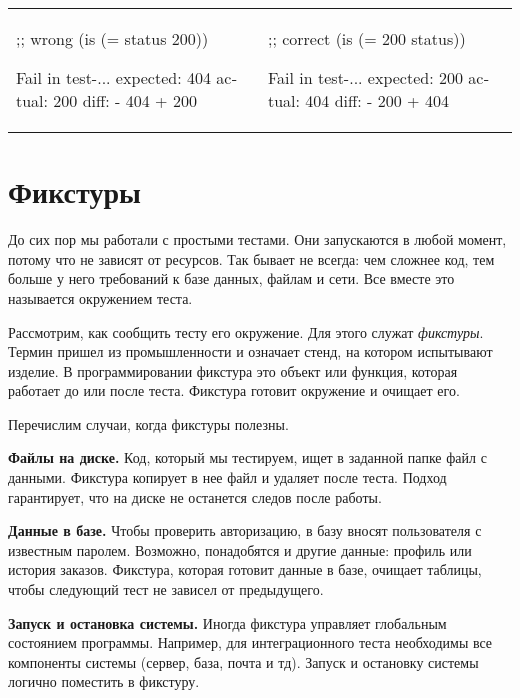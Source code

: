 \noindent
\begin{tabular}{ @{}p{5cm} @{}p{5cm} }

\begin{english}
  \begin{clojure}
;; wrong
(is (= status 200))

Fail in test-...
expected: 404
  actual: 200
    diff: - 404
          + 200
  \end{clojure}
\end{english}

&

\begin{english}
  \begin{clojure}
;; correct
(is (= 200 status))

Fail in test-...
expected: 200
  actual: 404
    diff: - 200
          + 404
  \end{clojure}
\end{english}

\end{tabular}

\section{Фикстуры}

До сих пор мы работали с простыми тестами. Они запускаются в любой момент,
потому что не зависят от ресурсов. Так бывает не всегда: чем сложнее код, тем
больше у него требований к базе данных, файлам и сети. Все вместе это называется
окружением теста.

Рассмотрим, как сообщить тесту его окружение. Для этого служат
\emph{фикстуры}. Термин пришел из промышленности и означает стенд, на котором
испытывают изделие. В программировании фикстура это объект или функция, которая
работает до или после теста. Фикстура готовит окружение и очищает его.

Перечислим случаи, когда фикстуры полезны.

\textbf{Файлы на диске.} Код, который мы тестируем, ищет в заданной папке файл с
данными. Фикстура копирует в нее файл и удаляет после теста. Подход гарантирует,
что на диске не останется следов после работы.

\textbf{Данные в базе.} Чтобы проверить авторизацию, в базу вносят пользователя
с известным паролем. Возможно, понадобятся и другие данные: профиль или история
заказов. Фикстура, которая готовит данные в базе, очищает таблицы, чтобы
следующий тест не зависел от предыдущего.

\textbf{Запуск и остановка системы.} Иногда фикстура управляет глобальным
состоянием программы. Например, для интеграционного теста необходимы все
компоненты системы (сервер, база, почта и тд). Запуск и остановку системы
логично поместить в фикстуру.

